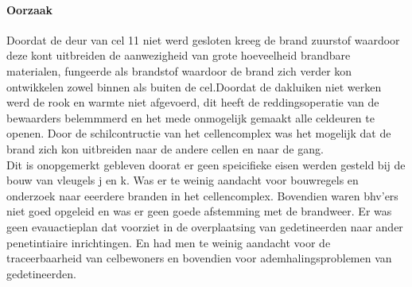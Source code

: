 \documentclass{article}
\begin{document}
	\paragraph{Oorzaak}
	\newline \indent 
	Doordat de deur van cel 11 niet werd gesloten kreeg de brand zuurstof waardoor deze kont uitbreiden de aanwezigheid van grote hoeveelheid brandbare materialen, fungeerde als brandstof waardoor de brand zich verder kon ontwikkelen zowel binnen als buiten de cel.Doordat de dakluiken niet  werken werd de rook en warmte niet afgevoerd, dit heeft de reddingsoperatie van de bewaarders belemmmerd en het mede onmogelijk gemaakt alle celdeuren te openen. Door de schilcontructie van het cellencomplex was het mogelijk dat de brand zich kon uitbreiden naar de andere cellen en naar de gang.\\
	Dit is onopgemerkt gebleven doorat er geen speicifieke eisen werden gesteld bij de bouw van vleugels j en k. Was er te weinig aandacht voor bouwregels en onderzoek naar eeerdere branden in het cellencomplex. Bovendien waren bhv'ers niet goed opgeleid en was er geen goede afstemming met de brandweer.
	Er was geen evauactieplan dat voorziet in de overplaatsing van gedetineerden naar ander penetintiaire inrichtingen. En had men te weinig aandacht voor de traceerbaarheid van celbewoners en bovendien voor ademhalingsproblemen van gedetineerden.
\end{document}
